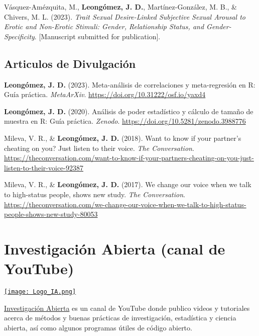 \documentclass[11pt,a4paper,]{awesome-cv}
\begin{document}
\begingroup
\footnotesize
\setlength{\parindent}{-0.5in}
\setlength{\leftskip}{0.5in}

Vásquez-Amézquita, M., \textbf{Leongómez, J. D.}, Martínez-González, M.
B., \& Chivers, M. L. (2023). \emph{Trait Sexual Desire-Linked
Subjective Sexual Arousal to Erotic and Non-Erotic Stimuli: Gender,
Relationship Status, and Gender-Specificity}. {[}Manuscript submitted
for publication{]}.

\endgroup

\subsection{\texorpdfstring{\textbf{Articulos de Divulgación}}{}}\label{section-2}

\begingroup
\footnotesize
\setlength{\parindent}{-0.5in}
\setlength{\leftskip}{0.5in}

\textbf{Leongómez, J. D.} (2023). Meta-análisis de correlaciones y
meta-regresión en R: Guía práctica. \emph{MetaArXiv}.
\url{https://doi.org/10.31222/osf.io/yaxd4}

\textbf{Leongómez, J. D.} (2020). Análisis de poder estadístico y
cálculo de tamaño de muestra en R: Guía práctica. \emph{Zenodo}.
\url{https://doi.org/10.5281/zenodo.3988776}

Mileva, V. R., \& \textbf{Leongómez, J. D.} (2018). Want to know if your
partner's cheating on you? Just listen to their voice. \emph{The
Conversation}.
\url{https://theconversation.com/want-to-know-if-your-partners-cheating-on-you-just-listen-to-their-voice-92387}

Mileva, V. R., \& \textbf{Leongómez, J. D.} (2017). We change our voice
when we talk to high-status people, shows new study. \emph{The
Conversation}.
\url{https://theconversation.com/we-change-our-voice-when-we-talk-to-high-status-people-shows-new-study-80053}

\endgroup

\section{Investigación Abierta (canal de
YouTube)}\label{investigaciuxf3n-abierta-canal-de-youtube}

\begin{minipage}[c]{0.15\linewidth}
\href{https://www.youtube.com/@InvestigacionAbierta}{\texttt{[image: Logo\_IA.png]}}
\end{minipage} \begin{minipage}[c]{0.85\linewidth}
\textcolor{red}{\faYoutube} \href{https://www.youtube.com/@InvestigacionAbierta}{Investigación Abierta} es un canal de YouTube donde publico videos y tutoriales acerca de métodos y buenas prácticas de investigación, estadística y ciencia abierta, así como algunos programas útiles de código abierto.
\end{minipage}
\end{document}
